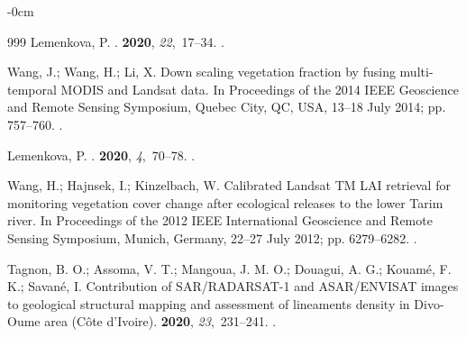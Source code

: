 \documentclass[jimaging,article,accept,pdftex,moreauthors]{Definitions/mdpi}
\begin{document}
\begin{adjustwidth}{-\extralength}{0cm}
\begin{thebibliography}{999}
Lemenkova, P.
.
  {\bf 2020}, {\em 22},~17--34.
.

Wang, J.; Wang, H.; Li, X.
\newblock Down scaling vegetation fraction by fusing multi-temporal MODIS and
  Landsat data.
\newblock In Proceedings of the 2014 IEEE Geoscience and Remote Sensing
  Symposium, Quebec City, QC, USA, 13--18 July 2014; pp. 757--760.
. %

Lemenkova, P.
.
 {\bf 2020}, {\em 4},~70--78.
.

Wang, H.; Hajnsek, I.; Kinzelbach, W.
\newblock Calibrated Landsat TM LAI retrieval for monitoring vegetation cover
  change after ecological releases to the lower Tarim river.
\newblock In Proceedings of the 2012 IEEE International Geoscience and Remote
  Sensing Symposium, Munich, Germany, 22--27 July 2012; pp. 6279--6282.
. %

Tagnon, B. O.; Assoma, V. T.; Mangoua, J. M. O.; Douagui, A. G.; Kouamé, F. K.; Savané,  I.
\newblock Contribution of SAR/RADARSAT-1 and ASAR/ENVISAT images to geological structural mapping and assessment of lineaments density in Divo-Oume area (Côte d’Ivoire).
 {\bf 2020}, {\em 23},~231--241.
.



\end{thebibliography}
\end{adjustwidth}
\end{document}
